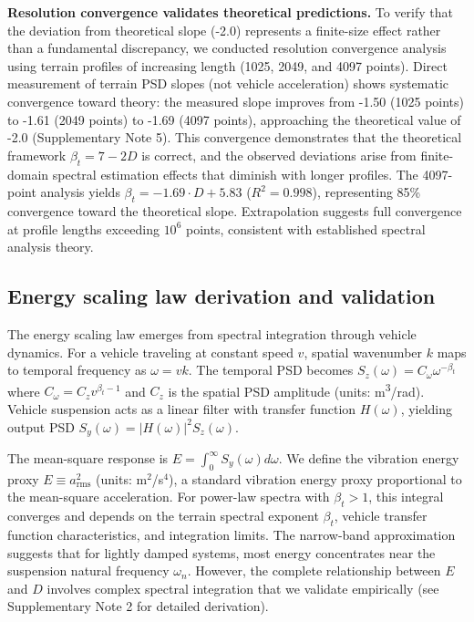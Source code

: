 \documentclass[11pt]{article}
\begin{document}
\textbf{Resolution convergence validates theoretical predictions.} To verify that the deviation from theoretical slope (-2.0) represents a finite-size effect rather than a fundamental discrepancy, we conducted resolution convergence analysis using terrain profiles of increasing length (1025, 2049, and 4097 points). Direct measurement of terrain PSD slopes (not vehicle acceleration) shows systematic convergence toward theory: the measured slope improves from -1.50 (1025 points) to -1.61 (2049 points) to -1.69 (4097 points), approaching the theoretical value of -2.0 (Supplementary Note 5). This convergence demonstrates that the theoretical framework $\beta_t = 7-2D$ is correct, and the observed deviations arise from finite-domain spectral estimation effects that diminish with longer profiles. The 4097-point analysis yields $\beta_t = -1.69 \cdot D + 5.83$ ($R^2 = 0.998$), representing 85\% convergence toward the theoretical slope. Extrapolation suggests full convergence at profile lengths exceeding $10^6$ points, consistent with established spectral analysis theory\cite{Bendat2010}.


\subsection*{Energy scaling law derivation and validation}

The energy scaling law emerges from spectral integration through vehicle dynamics. For a vehicle traveling at constant speed $v$, spatial wavenumber $k$ maps to temporal frequency as $\omega = vk$\cite{Robson1979,Wong2022}. The temporal PSD becomes $S_z(\omega) = C_\omega \omega^{-\beta_t}$ where $C_\omega = C_z v^{\beta_t-1}$ and $C_z$ is the spatial PSD amplitude (units: m\textsuperscript{3}/rad)\cite{Bendat2010}. Vehicle suspension acts as a linear filter with transfer function $H(\omega)$, yielding output PSD $S_y(\omega) = |H(\omega)|^2 S_z(\omega)$\cite{CrandallMark1963,Newland2005}.

The mean-square response is $E = \int_0^\infty S_y(\omega) d\omega$. We define the vibration energy proxy $E \equiv a_{\mathrm{rms}}^2$ (units: m$^2$/s$^4$), a standard vibration energy proxy proportional to the mean-square acceleration. For power-law spectra with $\beta_t > 1$, this integral converges and depends on the terrain spectral exponent $\beta_t$, vehicle transfer function characteristics, and integration limits. The narrow-band approximation\cite{Miles1954,Crandall1962} suggests that for lightly damped systems, most energy concentrates near the suspension natural frequency $\omega_n$. However, the complete relationship between $E$ and $D$ involves complex spectral integration that we validate empirically (see Supplementary Note 2 for detailed derivation).
\end{document}
